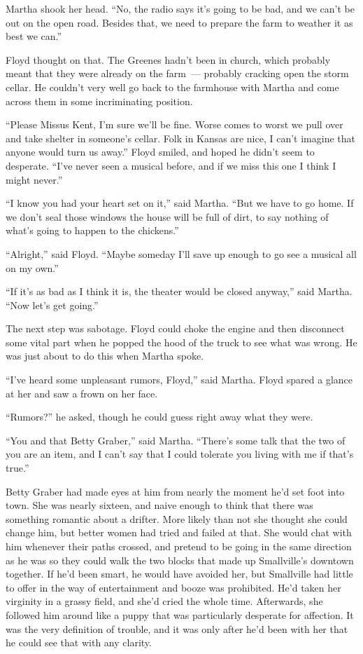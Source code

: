 \documentclass[ebook,12pt]{memoir}
\begin{document}
Martha shook her head. ``No, the radio says it's going to be bad, and we
can't be out on the open road. Besides that, we need to prepare the farm
to weather it as best we can.''

Floyd thought on that. The Greenes hadn't been in church, which probably
meant that they were already on the farm~--- probably cracking open the
storm cellar. He couldn't very well go back to the farmhouse with Martha
and come across them in some incriminating position.

``Please Missus Kent, I'm sure we'll be fine. Worse comes to worst we
pull over and take shelter in someone's cellar. Folk in Kansas are nice,
I can't imagine that anyone would turn us away.'' Floyd smiled, and
hoped he didn't seem to desperate. ``I've never seen a musical before,
and if we miss this one I think I might never.''

``I know you had your heart set on it,'' said Martha. ``But we have to
go home. If we don't seal those windows the house will be full of dirt,
to say nothing of what's going to happen to the chickens.''

``Alright,'' said Floyd. ``Maybe someday I'll save up enough to go see a
musical all on my own.''

``If it's as bad as I think it is, the theater would be closed anyway,''
said Martha. ``Now let's get going.''

The next step was sabotage. Floyd could choke the engine and then
disconnect some vital part when he popped the hood of the truck to see
what was wrong. He was just about to do this when Martha spoke.

``I've heard some unpleasant rumors, Floyd,'' said Martha. Floyd spared
a glance at her and saw a frown on her face.

``Rumors?'' he asked, though he could guess right away what they were.

``You and that Betty Graber,'' said Martha. ``There's some talk that the
two of you are an item, and I can't say that I could tolerate you living
with me if that's true.''

Betty Graber had made eyes at him from nearly the moment he'd set foot
into town. She was nearly sixteen, and naive enough to think that there
was something romantic about a drifter. More likely than not she thought
she could change him, but better women had tried and failed at that. She
would chat with him whenever their paths crossed, and pretend to be
going in the same direction as he was so they could walk the two blocks
that made up Smallville's downtown together. If he'd been smart, he
would have avoided her, but Smallville had little to offer in the way of
entertainment and booze was prohibited. He'd taken her virginity in a
grassy field, and she'd cried the whole time. Afterwards, she followed
him around like a puppy that was particularly desperate for affection.
It was the very definition of trouble, and it was only after he'd been
with her that he could see that with any clarity.
\end{document}
